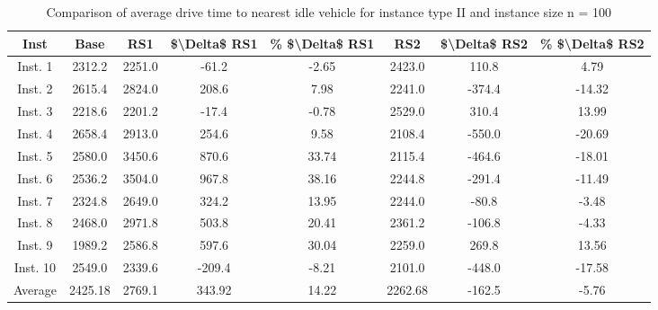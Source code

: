 \begin{table}[H]
\centering
\begin{tabular}{cccccccc}
  \hline
  \textbf{Inst} & \textbf{Base} & \textbf{RS1} & \textbf{\$\textbackslash{}Delta\$  RS1} & \textbf{\% \$\textbackslash{}Delta\$  RS1} & \textbf{RS2} & \textbf{\$\textbackslash{}Delta\$  RS2} & \textbf{\% \$\textbackslash{}Delta\$  RS2} \\\hline
  Inst. 1 & 2312.2 & 2251.0 & -61.2 & -2.65 & 2423.0 & 110.8 & 4.79 \\
  Inst. 2 & 2615.4 & 2824.0 & 208.6 & 7.98 & 2241.0 & -374.4 & -14.32 \\
  Inst. 3 & 2218.6 & 2201.2 & -17.4 & -0.78 & 2529.0 & 310.4 & 13.99 \\
  Inst. 4 & 2658.4 & 2913.0 & 254.6 & 9.58 & 2108.4 & -550.0 & -20.69 \\
  Inst. 5 & 2580.0 & 3450.6 & 870.6 & 33.74 & 2115.4 & -464.6 & -18.01 \\
  Inst. 6 & 2536.2 & 3504.0 & 967.8 & 38.16 & 2244.8 & -291.4 & -11.49 \\
  Inst. 7 & 2324.8 & 2649.0 & 324.2 & 13.95 & 2244.0 & -80.8 & -3.48 \\
  Inst. 8 & 2468.0 & 2971.8 & 503.8 & 20.41 & 2361.2 & -106.8 & -4.33 \\
  Inst. 9 & 1989.2 & 2586.8 & 597.6 & 30.04 & 2259.0 & 269.8 & 13.56 \\
  Inst. 10 & 2549.0 & 2339.6 & -209.4 & -8.21 & 2101.0 & -448.0 & -17.58 \\
  Average & 2425.18 & 2769.1 & 343.92 & 14.22 & 2262.68 & -162.5 & -5.76 \\\hline
\end{tabular}
\caption{Comparison of average drive time to nearest idle vehicle for instance type II and instance size n = 100}
\label{tab:wait:resrelocation-nearest-drive-time-comparison_II_100}
\end{table}
